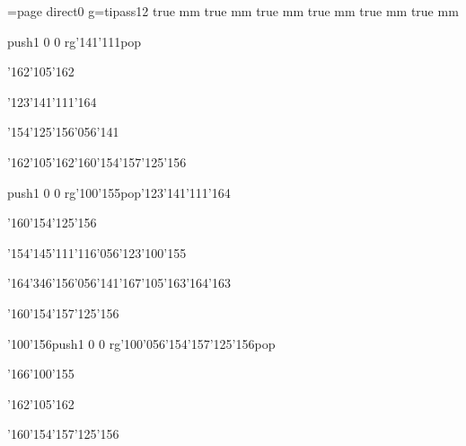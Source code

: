 \chardef\match=\pdfcolorstackinit page direct{0 g}\nopagenumbers\font\ipa=tipass12 true mm true mm true mm true mm true mm true mm
\null\vfill\ipa\centerline{\enskip\pdfcolorstack\match push{1 0 0 rg}\char'141\char'111\pdfcolorstack\match pop{}\enskip\enskip\enskip\enskip\enskip\enskip\enskip\enskip\enskip}\medskip\centerline{\enskip\enskip\enskip\enskip\enskip\char'162\char'105\char'162\enskip\enskip\enskip\enskip\enskip\enskip\enskip\enskip\enskip\enskip\enskip}\medskip\centerline{\enskip\enskip\enskip\enskip\enskip\enskip\enskip\enskip\enskip\enskip\char'123\char'141\char'111\char'164\enskip\enskip\enskip\enskip}\medskip\centerline{\enskip\char'154\char'125\char'156\char'056\char'141\enskip\enskip\enskip\enskip\enskip\enskip\enskip\enskip\enskip\enskip}\medskip\centerline{\enskip\enskip\enskip\char'162\char'105\char'162\enskip\enskip\enskip\enskip\char'160\char'154\char'157\char'125\char'156}\medskip\vfill\footline{\hfil\tt\folio\hfil}\eject
\null\vfill\ipa\centerline{\enskip\enskip\enskip\enskip\pdfcolorstack\match push{1 0 0 rg}\char'100\char'155\pdfcolorstack\match pop{}\enskip\enskip\char'123\char'141\char'111\char'164}\medskip\centerline{\enskip\char'160\char'154\char'125\char'156\enskip\enskip\enskip\enskip\enskip\enskip\enskip\enskip\enskip\enskip\enskip\enskip\enskip\enskip\enskip}\medskip\centerline{\enskip\enskip\enskip\enskip\enskip\enskip\enskip\enskip\enskip\enskip\char'154\char'145\char'111\char'116\char'056\char'123\char'100\char'155}\medskip\centerline{\enskip\char'164\char'346\char'156\char'056\char'141\enskip\enskip\enskip\enskip\enskip\char'167\char'105\char'163\char'164\char'163}\medskip\centerline{\enskip\enskip\enskip\enskip\enskip\enskip\enskip\enskip\enskip\char'160\char'154\char'157\char'125\char'156}\medskip\vfill\footline{\hfil\tt\folio\hfil}\eject
\null\vfill\ipa\centerline{\enskip\enskip\enskip\enskip\char'100\char'156\enskip\pdfcolorstack\match push{1 0 0 rg}\char'100\char'056\char'154\char'157\char'125\char'156\pdfcolorstack\match pop{}}\medskip\centerline{\enskip\enskip\enskip\enskip\enskip\enskip\enskip\enskip\enskip\enskip\enskip\enskip\enskip\enskip\enskip\enskip\enskip\enskip\enskip}\medskip\centerline{\enskip\enskip\enskip\char'166\char'100\char'155\enskip\enskip\enskip\enskip\enskip\enskip\enskip\enskip\enskip\enskip\enskip\enskip}\medskip\centerline{\enskip\enskip\enskip\enskip\enskip\char'162\char'105\char'162\enskip\enskip\enskip\enskip\enskip\enskip}\medskip\centerline{\enskip\enskip\enskip\enskip\enskip\enskip\enskip\enskip\enskip\char'160\char'154\char'157\char'125\char'156}\medskip\vfill\footline{\hfil\tt\folio\hfil}\eject
